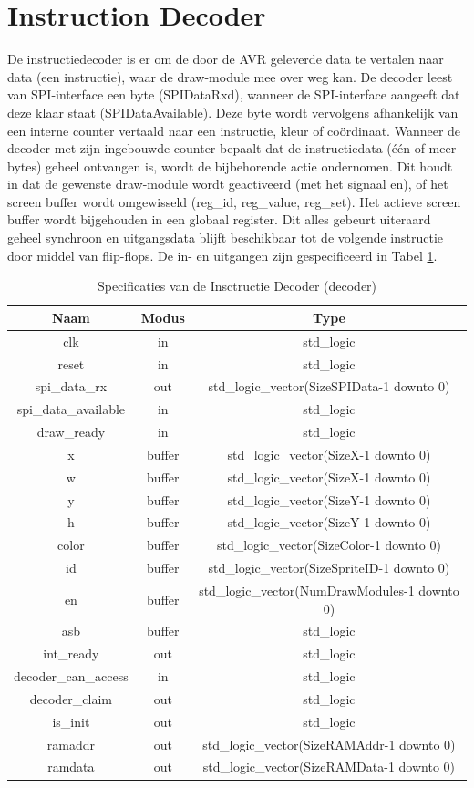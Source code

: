 \documentclass{scrartcl} %
\begin{document}
\section{Instruction Decoder}
De instructiedecoder is er om de door de AVR geleverde data te vertalen naar data (een instructie), waar de draw-module mee over weg kan.
De decoder leest van SPI-interface een byte (SPIDataRxd), wanneer de SPI-interface aangeeft dat deze klaar staat (SPIDataAvailable).
Deze byte wordt vervolgens afhankelijk van een interne counter vertaald naar een instructie, kleur of coördinaat.
Wanneer de decoder met zijn ingebouwde counter bepaalt dat de instructiedata (één of meer bytes) geheel ontvangen is, wordt de bijbehorende actie ondernomen.
Dit houdt in dat de gewenste draw-module wordt geactiveerd (met het signaal en), of het screen buffer wordt omgewisseld (reg\_id, reg\_value, reg\_set).
Het actieve screen buffer wordt bijgehouden in een globaal register.
Dit alles gebeurt uiteraard geheel synchroon en uitgangsdata blijft beschikbaar tot de volgende instructie door middel van flip-flops.
De in- en uitgangen zijn gespecificeerd in Tabel \ref{tab:spec-decoder}.

\begin{table}[H]
\centering
\caption{Specificaties van de Insctructie Decoder (decoder)}
\label{tab:spec-decoder}
\begin{tabular}{c c c}
	\hline\hline
 	Naam & Modus & Type\\
 	\hline
	clk & in & std\_logic \\
	reset & in & std\_logic \\	
	spi\_data\_rx & out & std\_logic\_vector(SizeSPIData-1 downto 0) \\
	spi\_data\_available & in & std\_logic \\
	draw\_ready & in & std_logic\\ 	
	x &  buffer & std\_logic\_vector(SizeX-1 downto 0) \\
	w &  buffer & std\_logic\_vector(SizeX-1 downto 0) \\
	y &  buffer & std\_logic\_vector(SizeY-1 downto 0) \\
	h &  buffer & std\_logic\_vector(SizeY-1 downto 0) \\
	color &  buffer & std\_logic\_vector(SizeColor-1 downto 0) \\
	id &  buffer & std\_logic\_vector(SizeSpriteID-1 downto 0) \\
	en & buffer & std\_logic\_vector(NumDrawModules-1 downto 0)\\
	asb & buffer & std\_logic \\ 
	int\_ready & out & std\_logic \\
	decoder\_can\_access & in & std\_logic \\
	decoder\_claim & out & std\_logic \\
	is\_init & out & std\_logic \\
	 ramaddr & out & std\_logic\_vector(SizeRAMAddr-1 downto 0) \\
	 ramdata & out & std\_logic\_vector(SizeRAMData-1 downto 0) \\
  	\hline
\end{tabular}
\end{table}
\end{document}
